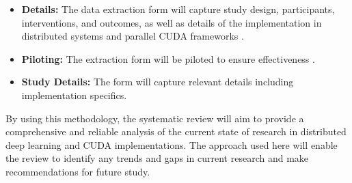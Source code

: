 
\begin{itemize}
	\item \textbf{Details:} The data extraction form will capture study design, participants, interventions, and outcomes, as well as details of the implementation in distributed systems and parallel CUDA frameworks \cite{ben-nun_demystifying_2020}.
	\item \textbf{Piloting:} The extraction form will be piloted to ensure effectiveness \cite{ben-nun_demystifying_2020}.
	\item \textbf{Study Details:} The form will capture relevant details including implementation specifics.
\end{itemize}

By using this methodology, the systematic review will aim to provide a comprehensive and reliable
analysis of the current state of research in distributed deep learning and CUDA implementations.
The approach used here will enable the review to identify any trends and gaps in current research
and make recommendations for future study.

